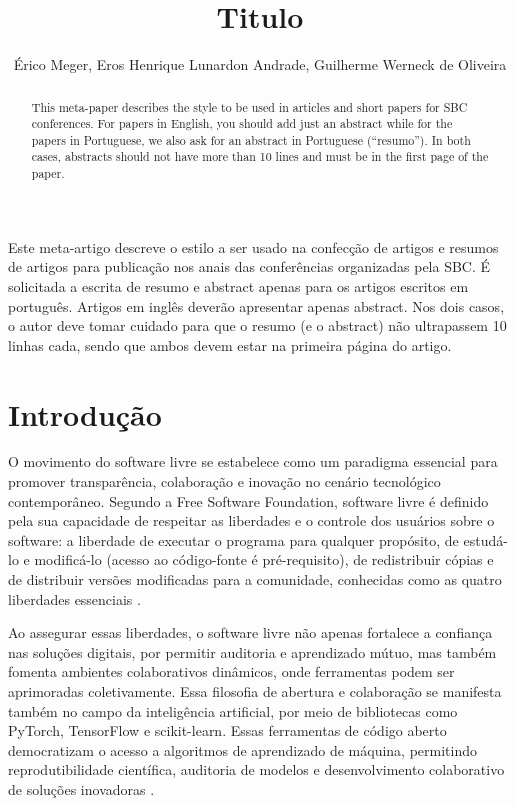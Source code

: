 \documentclass[12pt]{article}
\title{Titulo}
\author{Érico Meger\inst{1}, Eros Henrique Lunardon Andrade\inst{1}, Guilherme Werneck de Oliveira\inst{1}}
\begin{document}
\maketitle

\begin{abstract}
  This meta-paper describes the style to be used in articles and short papers
  for SBC conferences. For papers in English, you should add just an abstract
  while for the papers in Portuguese, we also ask for an abstract in
  Portuguese (``resumo''). In both cases, abstracts should not have more than
  10 lines and must be in the first page of the paper.
\end{abstract}

\begin{resumo}
  Este meta-artigo descreve o estilo a ser usado na confecção de artigos e
  resumos de artigos para publicação nos anais das conferências organizadas
  pela SBC. É solicitada a escrita de resumo e abstract apenas para os artigos
  escritos em português. Artigos em inglês deverão apresentar apenas abstract.
  Nos dois casos, o autor deve tomar cuidado para que o resumo (e o abstract)
  não ultrapassem 10 linhas cada, sendo que ambos devem estar na primeira
  página do artigo.
\end{resumo}

\section{Introdução}

O movimento do software livre se estabelece como um paradigma essencial para
promover transparência, colaboração e inovação no cenário tecnológico
contemporâneo. Segundo a Free Software Foundation, software livre é definido
pela sua capacidade de respeitar as liberdades e o controle dos usuários sobre
o software: a liberdade de executar o programa para qualquer propósito, de
estudá-lo e modificá-lo (acesso ao código-fonte é pré-requisito), de
redistribuir cópias e de distribuir versões modificadas para a comunidade,
conhecidas como as quatro liberdades essenciais \cite{gnu_freesw}.

Ao assegurar essas liberdades, o software livre não apenas fortalece a
confiança nas soluções digitais, por permitir auditoria e aprendizado mútuo,
mas também fomenta ambientes colaborativos dinâmicos, onde ferramentas podem
ser aprimoradas coletivamente. Essa filosofia de abertura e colaboração se
manifesta também no campo da inteligência artificial, por meio de bibliotecas
como PyTorch, TensorFlow e scikit-learn. Essas ferramentas de código aberto
democratizam o acesso a algoritmos de aprendizado de máquina, permitindo
reprodutibilidade científica, auditoria de modelos e desenvolvimento
colaborativo de soluções inovadoras \cite{pytorch_about, tensorflow_about}.
\end{document}
